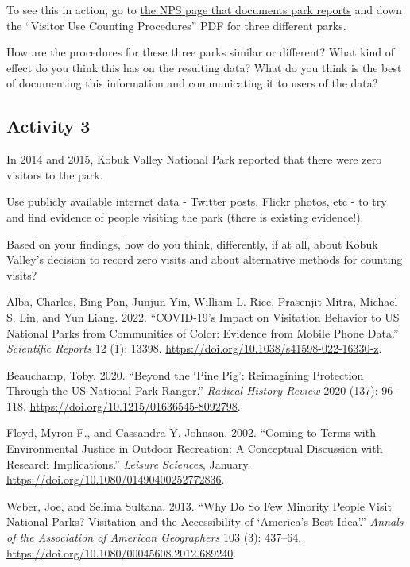 \documentclass[
  letterpaper,
  DIV=11,
  numbers=noendperiod]{scrartcl}
\newlength{\cslhangindent}
\newenvironment{CSLReferences}[2] %
 {\begin{list}{}{%
  \setlength{\itemindent}{0pt}
  \setlength{\leftmargin}{0pt}
  \setlength{\parsep}{0pt}
  \ifodd #1
   \setlength{\leftmargin}{\cslhangindent}
   \setlength{\itemindent}{-1\cslhangindent}
  \fi
  \setlength{\itemsep}{#2\baselineskip}}}
 {\end{list}}
\begin{document}
To see this in action, go to
\href{https://irma.nps.gov/Stats/Reports/Park}{the NPS page that
documents park reports} and down the ``Visitor Use Counting Procedures''
PDF for three different parks.

How are the procedures for these three parks similar or different? What
kind of effect do you think this has on the resulting data? What do you
think is the best of documenting this information and communicating it
to users of the data?

\subsection{Activity 3}\label{activity-3}

In 2014 and 2015, Kobuk Valley National Park reported that there were
zero visitors to the park.

Use publicly available internet data - Twitter posts, Flickr photos, etc
- to try and find evidence of people visiting the park (there is
existing evidence!).

Based on your findings, how do you think, differently, if at all, about
Kobuk Valley's decision to record zero visits and about alternative
methods for counting visits?

\label{refs}
\begin{CSLReferences}{1}{0}
Alba, Charles, Bing Pan, Junjun Yin, William L. Rice, Prasenjit Mitra,
Michael S. Lin, and Yun Liang. 2022. {``{COVID}-19's Impact on
Visitation Behavior to {US} National Parks from Communities of Color:
Evidence from Mobile Phone Data.''} \emph{Scientific Reports} 12 (1):
13398. \url{https://doi.org/10.1038/s41598-022-16330-z}.

Beauchamp, Toby. 2020. {``Beyond the {`{Pine} {Pig}'}: {Reimagining}
{Protection} Through the {US} {National} {Park} {Ranger}.''}
\emph{Radical History Review} 2020 (137): 96--118.
\url{https://doi.org/10.1215/01636545-8092798}.

Floyd, Myron F., and Cassandra Y. Johnson. 2002. {``Coming to {Terms}
with {Environmental} {Justice} in {Outdoor} {Recreation}: {A}
{Conceptual} {Discussion} with {Research} {Implications}.''}
\emph{Leisure Sciences}, January.
\url{https://doi.org/10.1080/01490400252772836}.

Weber, Joe, and Selima Sultana. 2013. {``Why {Do} {So} {Few} {Minority}
{People} {Visit} {National} {Parks}? {Visitation} and the
{Accessibility} of {`{America}'s {Best} {Idea}'}.''} \emph{Annals of the
Association of American Geographers} 103 (3): 437--64.
\url{https://doi.org/10.1080/00045608.2012.689240}.

\end{CSLReferences}
\end{document}
